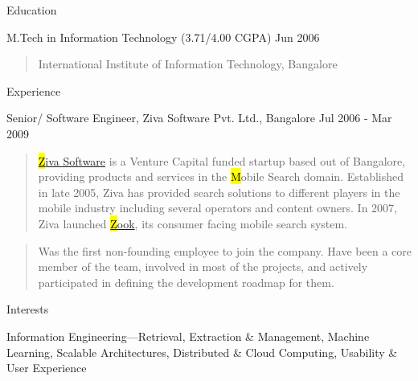 \documentclass{resume}
\author{Siddhartha Reddy Kothakapu}
\begin{document}
 \maketitle

\begin{category}{Education}{}

    \item {\topic M.Tech in Information Technology}
        {\footnotesize(3.71/4.00 CGPA)}
        {\period Jun 2006}
        \begin{quote}
            International Institute of Information Technology, Bangalore
        \end{quote}

\end{category}


\begin{category}{Experience}{}

    \item {\topic Senior/ Software Engineer,} Ziva Software Pvt. Ltd., Bangalore
        {\period Jul 2006 - Mar 2009}
        \begin{quote}
            \href{http://www.zook.in/}{{\hl Ziva Software}} is a Venture
            Capital funded startup based out of Bangalore, providing products
            and services in the {\hl Mobile Search} domain.  Established in
            late 2005, Ziva has provided search solutions to different players
            in the mobile industry including several operators and content
            owners. In 2007, Ziva launched \href{http://www.zook.in/}{{\hl
            Zook}}, its consumer facing mobile search system.
        \end{quote}
        \begin{quote}
            Was the first non-founding employee to join the company. Have been
            a core member of the team, involved in most of the projects, and    %
            actively participated in defining the development roadmap for them.
        \end{quote}

\end{category}


\begin{category}{Interests}{}

    \item Information Engineering---Retrieval, Extraction \& Management,
        Machine Learning, Scalable Architectures, Distributed \& Cloud
        Computing, Usability \& User Experience

\end{category}
\end{document}
